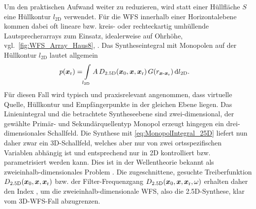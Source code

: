 Um den praktischen Aufwand weiter zu reduzieren, wird statt
einer Hüllfläche $S$ eine Hüllkontur $l_\text{2D}$ verwendet.
%
Für die WFS innerhalb einer Horizontalebene kommen dabei oft lineare bzw.
kreis- oder rechteckartig umhüllende Lautsprecherarrays zum Einsatz,
idealerweise auf Ohrhöhe,
vgl.~\Abb\ref{fig:WFS_Array_Haus8}, \cite{Vries2009_Mono,Vries2019}.
%
Das Syntheseintegral mit Monopolen auf der Hüllkontur $l_\text{2D}$
lautet allgemein
\begin{align}
p(\bm{x}_\mathrm{r}) =& \int\limits_{l_\text{2D}} A \, D_\text{2.5D}(\bm{x}_\mathrm{0},\bm{x},\bm{x}_\mathrm{r}) \, G(r_{\bm{x}\text{-}\bm{x}_\mathrm{r}}) \, \mathrm{d}l_\text{2D}.
\label{eq:MonopolIntegral_25D}
\end{align}
%
Für diesen Fall wird typisch und praxisrelevant angenommen, dass
virtuelle Quelle, Hüllkontur und Empfängerpunkte in der gleichen Ebene liegen.
%
Das Linienintegral und die betrachtete Syntheseebene sind zwei-dimensional,
der gewählte Primär- und Sekundärquellentyp Monopol erzeugt hingegen ein
drei-dimensionales Schallfeld.
%
Die Synthese mit \Glg\eqref{eq:MonopolIntegral_25D} liefert nun daher
zwar ein 3D-Schallfeld, welches aber nur von zwei ortsspezifischen
Variablen abhängig ist und
entsprechend nur in 2D kontrolliert bzw. parametrisiert werden kann.
%
Dies ist in der Wellentheorie bekannt als zweieinhalb-dimensionales
Problem \cite{Bleistein1986}. %
%
Die zugeschnittene, gesuchte Treiberfunktion $D_\text{2.5D}(\bm{x}_\mathrm{0},\bm{x},\bm{x}_\mathrm{r})$ bzw.
der Filter-Frequenzgang $D_\text{2.5D}(\bm{x}_\mathrm{0},\bm{x},\bm{x}_\mathrm{r},\omega)$ erhalten daher
den Index , um die zweieinhalb-dimensionale WFS, also
die 2.5D-Synthese, klar vom 3D-WFS-Fall abzugrenzen.


